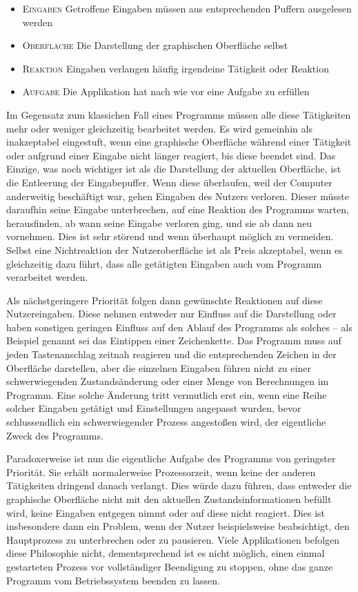 \begin{itemize}
  \item \textsc{Eingaben} Getroffene Eingaben müssen aus entsprechenden Puffern ausgelesen werden
  \item \textsc{Oberfläche} Die Darstellung der graphischen Oberfläche selbst
  \item \textsc{Reaktion} Eingaben verlangen häufig irgendeine Tätigkeit oder Reaktion
  \item \textsc{Aufgabe} Die Applikation hat nach wie vor eine Aufgabe zu erfüllen
\end{itemize}

Im Gegensatz zum klassichen Fall eines Programms müssen alle diese Tätigkeiten
mehr oder weniger gleichzeitig bearbeitet werden. Es wird gemeinhin als inakzeptabel
eingestuft, wenn eine graphische Oberfläche während einer Tätigkeit oder aufgrund
einer Eingabe nicht länger reagiert, bis diese beendet sind. Das Einzige, was
noch wichtiger ist als die Darstellung der aktuellen Oberfläche, ist die Entleerung
der Eingabepuffer. Wenn diese überlaufen, weil der Computer anderweitig beschäftigt
war, gehen Eingaben des Nutzers verloren. Dieser müsste daraufhin seine Eingabe
unterbrechen, auf eine Reaktion des Programms warten, herausfinden, ab wann seine
Eingabe verloren ging, und sie ab dann neu vornehmen. Dies ist sehr störend
und wenn überhaupt möglich zu vermeiden. Selbst eine Nichtreaktion der Nutzeroberfläche
ist als Preis akzeptabel, wenn es gleichzeitig dazu führt, dass alle getätigten
Eingaben auch vom Programm verarbeitet werden.

Als nächstgeringere Priorität folgen dann gewünschte Reaktionen auf diese Nutzereingaben.
Diese nehmen entweder nur Einfluss auf die Darstellung oder haben sonstigen
geringen Einfluss auf den Ablauf des Programms als solches -- als Beispiel genannt
sei das Eintippen einer Zeichenkette. Das Programm muss auf jeden Tastenanschlag
zeitnah reagieren und die entsprechenden Zeichen in der Oberfläche darstellen,
aber die einzelnen Eingaben führen nicht zu einer schwerwiegenden Zustandsänderung
oder einer Menge von Berechnungen im Programm. Eine solche Änderung tritt vermutlich 
erst ein, wenn eine Reihe solcher Eingaben getätigt und Einstellungen angepasst wurden, 
bevor schlussendlich ein \glqq{}schwerwiegender\grqq{} Prozess angestoßen wird,
der eigentliche Zweck des Programms.

Paradoxerweise ist nun die eigentliche Aufgabe des Programms von geringster Priorität. 
Sie erhält normalerweise Prozessorzeit, wenn keine der anderen Tätigkeiten dringend 
danach verlangt. Dies würde dazu führen, dass entweder die graphische Oberfläche
nicht mit den aktuellen Zustandsinformationen befüllt wird, keine Eingaben entgegen
nimmt oder auf diese nicht reagiert. Dies ist insbesondere dann ein Problem, wenn der
Nutzer beispielsweise beabsichtigt, den Hauptprozess zu unterbrechen oder zu pausieren.
Viele Applikationen befolgen diese Philosophie nicht, dementsprechend ist es nicht
möglich, einen einmal gestarteten Prozess vor vollständiger Beendigung zu stoppen,
ohne das ganze Programm vom Betriebssystem beenden zu lassen.

